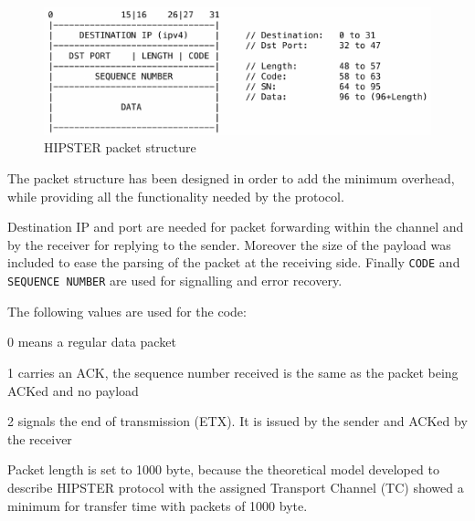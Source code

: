 \documentclass[10pt,twocolumn]{article}
\begin{document}
\begin{figure}[htp]
	\centering
    \includegraphics[width=0.95\columnwidth]{tex/images/packet_structure.pdf}
	\caption{HIPSTER packet structure}
	\label{fig:header}
\end{figure}
The packet structure has been designed in order to add the minimum overhead,
while providing all the functionality needed by the protocol.

Destination IP and port are needed for packet forwarding within the channel
and by the receiver for replying to the sender. Moreover the size of the
payload was included to ease the parsing of the packet at the receiving side.
Finally \texttt{CODE} and \texttt{SEQUENCE NUMBER} are used for signalling
and error recovery.

The following values are used for the code:
\begin{compactitem}
\item 0 means a regular data packet
\item 1 carries an ACK, the sequence number received is the same as the packet
	being ACKed and no payload
\item 2 signals the end of transmission (ETX). It is issued by the sender and
	ACKed by the receiver
\end{compactitem}

Packet length is set to 1000 byte, because the theoretical model developed to describe HIPSTER protocol with the assigned Transport Channel (TC) showed a minimum for transfer time with packets of 1000 byte. \\
\end{document}
